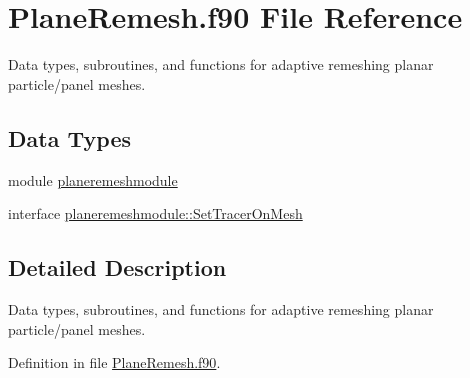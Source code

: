 \hypertarget{_plane_remesh_8f90}{\section{Plane\+Remesh.\+f90 File Reference}
\label{_plane_remesh_8f90}
}


Data types, subroutines, and functions for adaptive remeshing planar particle/panel meshes.  


\subsection*{Data Types}
\begin{DoxyCompactItemize}
\item 
module \hyperlink{classplaneremeshmodule}{planeremeshmodule}
\item 
interface \hyperlink{interfaceplaneremeshmodule_1_1_set_tracer_on_mesh}{planeremeshmodule\+::\+Set\+Tracer\+On\+Mesh}
\end{DoxyCompactItemize}


\subsection{Detailed Description}
Data types, subroutines, and functions for adaptive remeshing planar particle/panel meshes. 



Definition in file \hyperlink{_plane_remesh_8f90_source}{Plane\+Remesh.\+f90}.

